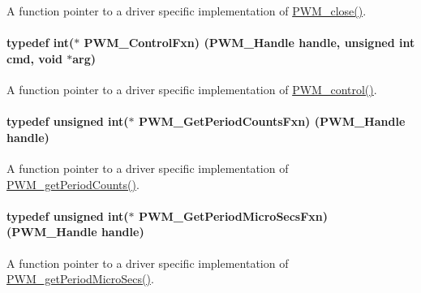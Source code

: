 A function pointer to a driver specific implementation of \hyperlink{_p_w_m_8h_a0e0f5899b067d27653db566fb148db11}{P\+W\+M\+\_\+close()}. 

\paragraph[{P\+W\+M\+\_\+\+Control\+Fxn}]{\setlength{\rightskip}{0pt plus 5cm}typedef int($\ast$ P\+W\+M\+\_\+\+Control\+Fxn) ({\bf P\+W\+M\+\_\+\+Handle} handle, unsigned int cmd, void $\ast$arg)}\label{_p_w_m_8h_af538c912f876c434c62e7e0e28d41b75}


A function pointer to a driver specific implementation of \hyperlink{_p_w_m_8h_ade999f5b12997479efa1ac85aaf46ef5}{P\+W\+M\+\_\+control()}. 

\paragraph[{P\+W\+M\+\_\+\+Get\+Period\+Counts\+Fxn}]{\setlength{\rightskip}{0pt plus 5cm}typedef unsigned int($\ast$ P\+W\+M\+\_\+\+Get\+Period\+Counts\+Fxn) ({\bf P\+W\+M\+\_\+\+Handle} handle)}\label{_p_w_m_8h_a4ac091a98716ff54c33b0d300a2a7fee}


A function pointer to a driver specific implementation of \hyperlink{_p_w_m_8h_af7c6d8e045f6f5cc8b978d68bead5b41}{P\+W\+M\+\_\+get\+Period\+Counts()}. 

\paragraph[{P\+W\+M\+\_\+\+Get\+Period\+Micro\+Secs\+Fxn}]{\setlength{\rightskip}{0pt plus 5cm}typedef unsigned int($\ast$ P\+W\+M\+\_\+\+Get\+Period\+Micro\+Secs\+Fxn) ({\bf P\+W\+M\+\_\+\+Handle} handle)}\label{_p_w_m_8h_a4eb84d54d5b3a05e6ae9d8a580a48b45}


A function pointer to a driver specific implementation of \hyperlink{_p_w_m_8h_a150ccda2b9cb65f8c12d173bba10df53}{P\+W\+M\+\_\+get\+Period\+Micro\+Secs()}. 

